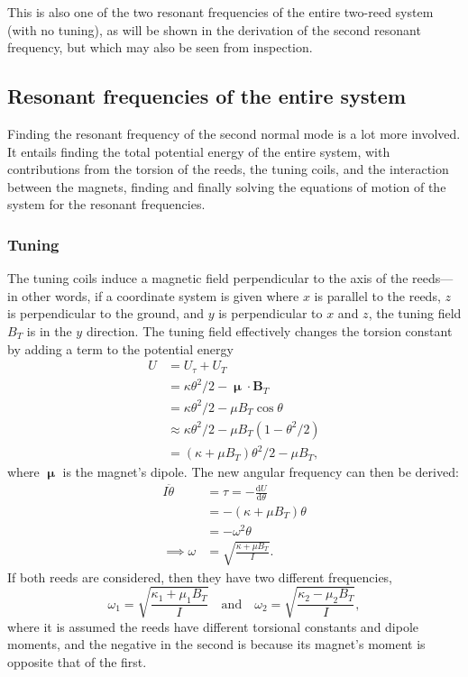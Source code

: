 \documentclass{article}
\begin{document}
This is also one of the two resonant frequencies of the entire two-reed system (with no tuning), as will be shown in the derivation of the second resonant frequency, but which may also be seen from inspection.

\subsection{Resonant frequencies of the entire system}
Finding the resonant frequency of the second normal mode is a lot more involved. It entails finding the total potential energy of the entire system, with contributions from the torsion of the reeds, the tuning coils, and the interaction between the magnets, finding and finally solving the equations of motion of the system for the resonant frequencies.
\subsubsection{Tuning}
The tuning coils induce a magnetic field perpendicular to the axis of the reeds---in other words, if a coordinate system is given where $x$ is parallel to the reeds, $z$ is perpendicular to the ground, and $y$ is perpendicular to $x$ and $z$, the tuning field $B_T$ is in the $y$ direction. The tuning field effectively changes the torsion constant by adding a term to the potential energy
\begin{equation*}
  \begin{aligned}
    U   &= U_\tau + U_T \\
    &= \kappa\theta^2/2 - \bm{\upmu}\cdot\mathbf{B}_T \\
    &= \kappa\theta^2/2 - \mu B_T \cos \theta \\
    &\approx \kappa\theta^2/2 - \mu B_T (1-\theta^2/2) \\
    &= (\kappa+\mu B_T)\theta^2/2 - \mu B_T,
  \end{aligned}
\end{equation*}
where $\bm{\upmu}$ is the magnet's dipole. The new angular frequency can then be derived:
\begin{equation*}
  \begin{aligned}
    I \ddot{\theta} &= \tau = -\frac{\mathrm{d}U}{\mathrm{d}\theta} \\
    &= -(\kappa + \mu B_T)\theta \\
    &= -\omega^2 \theta \\
    \implies \omega &=  \sqrt{\frac{\kappa + \mu B_T}{I}}.
  \end{aligned}
\end{equation*}
If both reeds are considered, then they have two different frequencies,
\begin{equation*}
  \omega_1 = \sqrt{\frac{\kappa_1 + \mu_1 B_T}{I}}\quad\text{and}\quad\omega_2 = \sqrt{\frac{\kappa_2 - \mu_2 B_T}{I}},
\end{equation*}
where it is assumed the reeds have different torsional constants and dipole moments, and the negative in the second is because its magnet's moment is opposite that of the first.
\end{document}
